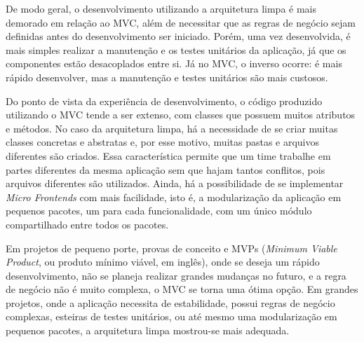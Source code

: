 De modo geral, o desenvolvimento utilizando a arquitetura limpa é mais demorado em relação ao MVC, além de necessitar que as regras de negócio sejam definidas antes do desenvolvimento ser iniciado.
Porém, uma vez desenvolvida, é mais simples realizar a manutenção e os testes unitários da aplicação, já que os componentes estão desacoplados entre si.
Já no MVC, o inverso ocorre: é mais rápido desenvolver, mas a manutenção e testes unitários são mais custosos.

Do ponto de vista da experiência de desenvolvimento, o código produzido utilizando o MVC tende a ser extenso, com classes que possuem muitos atributos e métodos.
No caso da arquitetura limpa, há a necessidade de se criar muitas classes concretas e abstratas e, por esse motivo, muitas pastas e arquivos diferentes são criados.
Essa característica permite que um time trabalhe em partes diferentes da mesma aplicação sem que hajam tantos conflitos, pois arquivos diferentes são utilizados.
Ainda, há a possibilidade de se implementar \emph{Micro Frontends} com mais facilidade, isto é, a modularização da aplicação em pequenos pacotes, um para cada funcionalidade, com um único módulo compartilhado entre todos os pacotes.

Em projetos de pequeno porte, provas de conceito e MVPs (\emph{Minimum Viable Product}, ou produto mínimo viável, em inglês), onde se deseja um rápido desenvolvimento, não se planeja realizar grandes mudanças no futuro, e a regra de negócio não é muito complexa, o MVC se torna uma ótima opção.
Em grandes projetos, onde a aplicação necessita de estabilidade, possui regras de negócio complexas, esteiras de testes unitários, ou até mesmo uma modularização em pequenos pacotes, a arquitetura limpa mostrou-se mais adequada.